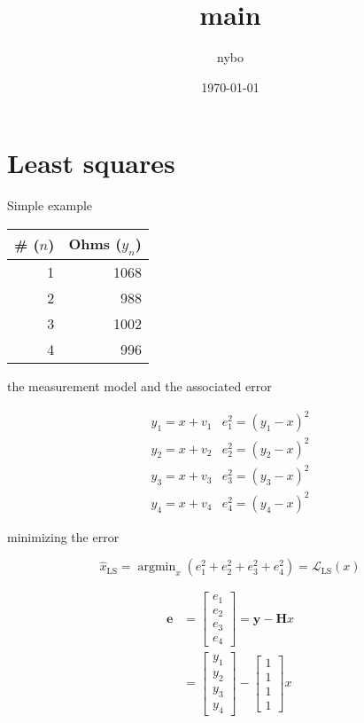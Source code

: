 \documentclass[a4paper]{article}
\author{nybo}
\date{\today}
\title{main}
\begin{document}
\maketitle
\tableofcontents

\newpage
\section{Least squares}
\label{sec-1}

Simple example

\begin{center}
\begin{tabular}{rr}
\# ($n$) & Ohms ($y_n$)\\
\hline
1 & 1068\\
2 & 988\\
3 & 1002\\
4 & 996\\
\end{tabular}
\end{center}

the measurement model and the associated error

$$\begin{array}{ll}
{y_{1}=x+v_{1}} & {e_{1}^{2}=\left(y_{1}-x\right)^{2}} \\
 {y_{2}=x+v_{2}} & {e_{2}^{2}=\left(y_{2}-x\right)^{2}} \\
 {y_{3}=x+v_{3}} & {e_{3}^{2}=\left(y_{3}-x\right)^{2}} \\
 {y_{4}=x+v_{4}} & {e_{4}^{2}=\left(y_{4}-x\right)^{2}}
\end{array}$$

minimizing the error

$$\hat{x}_{\mathrm{LS}}=\operatorname{argmin}_{x}\left(e_{1}^{2}+e_{2}^{2}+e_{3}^{2}+e_{4}^{2}\right)=\mathscr{L}_{\mathrm{LS}}(x)$$

$$\begin{aligned} 
\mathbf{e} &= \left[\begin{array}{l}{e_{1}} \\ {e_{2}} \\ {e_{3}} \\ {e_{4}}\end{array}\right]  =\mathbf{y}-\mathbf{H} x \\
&=\left[\begin{array}{l}{y_{1}} \\ {y_{2}} \\ {y_{3}} \\ {y_{4}}\end{array}\right]-\left[\begin{array}{l}{1} \\ {1} \\ {1} \\ {1}\end{array}\right] x 
\end{aligned}$$
\end{document}
